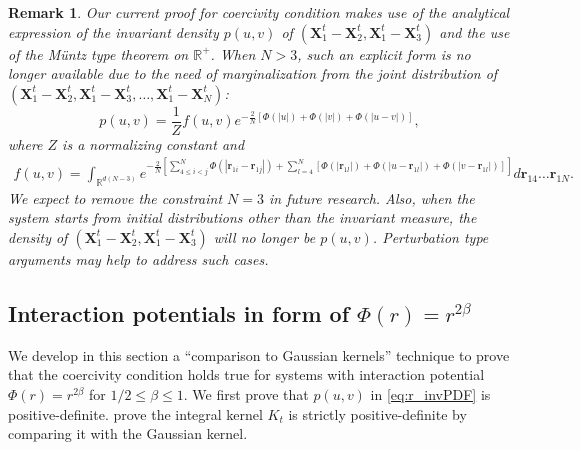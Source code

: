 \documentclass[]{elsarticle}
\def\R{\mathbb{R}}
\newcommand{\mbf}[1]{\boldsymbol{#1}}
\newcommand{\bX}{\mbf{X}}
\newtheorem{remark}[theorem]{Remark}
\numberwithin{equation}{section}
\numberwithin{theorem}{section}
\begin{document}
\begin{remark}\label{Rmk:N=3}
Our current proof for coercivity condition makes use of the analytical expression of the invariant density $p(u,v)$ of $(\bX^{t}_1- \bX^t_2, \bX^{t}_1- \bX^t_3)$ and the use of the M\"untz type theorem on $\R^+$. When $N>3$, such an explicit form is no longer available due to the need of marginalization from the joint distribution of $(\bX^{t}_1- \bX^t_2, \bX^{t}_1- \bX^t_3,\dots,\bX^{t}_1- \bX^t_N)$:
\begin{equation*}
p(u,v)=\frac{1}{Z}f(u,v)e^{-\frac{2}{N}\left[\Phi(|u|)+\Phi(|v|)+\Phi(|u-v|)\right]},
\end{equation*}
where $Z$ is a normalizing constant and 
\begin{align*}
f(u,v)=\int_{\R^{d(N-3)}} 
\label{fuv} e^{-\frac{2}{N}\left[\sum_{4\leq i<j}^N\Phi(|\mathbf{r}_{1i}-\mathbf{r}_{1j}|)+\sum_{l=4}^N\left[\Phi(|\mathbf{r}_{1l}|)+\Phi(|u-\mathbf{r}_{1l}|)+\Phi(|v-\mathbf{r}_{1l}|)\right]\right]}     d\mathbf{r}_{14}\ldots\mathbf{r}_{1N}. 
\end{align*}
We expect to remove the constraint $N=3$ in future research.  Also, when the system starts from initial distributions other than the invariant measure, the density of $(\bX^{t}_1- \bX^t_2, \bX^{t}_1- \bX^t_3)$ will no longer be $p(u,v)$. Perturbation type arguments may help to address such cases.
\end{remark}


\subsection{Interaction potentials in form of $\Phi(r) = r^{2\beta}$} \label{sec:powerFn} 
We develop in this section a ``comparison to Gaussian kernels'' technique to prove that the coercivity condition holds true for systems with interaction potential $\Phi(r) = r^{2\beta}$ for $1/2\leq \beta\leq 1$.  
We first prove that $p(u,v)$ in \eqref{eq:r_invPDF} is positive-definite.  prove the integral kernel $K_t$ is strictly positive-definite by comparing it with the Gaussian kernel. 
\end{document}
